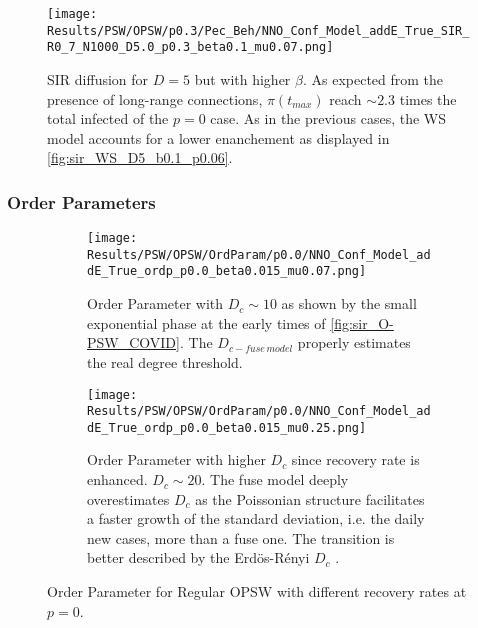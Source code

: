 \documentclass[a4paper,10pt,twoside]{book} %
\theoremstyle{definition}
\begin{document}
\begin{figure}[H]
	\centering
	\texttt{[image: Results/PSW/OPSW/p0.3/Pec\_Beh/NNO\_Conf\_Model\_addE\_True\_SIR\_R0\_7\_N1000\_D5.0\_p0.3\_beta0.1\_mu0.07.png]}
	\caption{SIR diffusion for $ D = 5$ but with higher $\beta$. As expected from the presence of long-range connections, $\pi(t_{max})$ reach $\sim 2.3$ times the total infected of the $ p=0$ case. As in the previous cases, the WS model accounts for a lower enanchement as displayed in \autoref{fig:sir_WS_D5_b0.1_p0.06}.}
	\label{fig:sir_O-PSW_D5_p0.3_b0.1}
\end{figure}

\clearpage
\subsubsection*{Order Parameters}
\begin{figure}[t]
	\begin{subfigure}[t]{0.48\linewidth}
		\centering
		\texttt{[image: Results/PSW/OPSW/OrdParam/p0.0/NNO\_Conf\_Model\_addE\_True\_ordp\_p0.0\_beta0.015\_mu0.07.png]} 
		\caption{Order Parameter with $D_c \sim 10$ as shown by the small exponential phase at the early times of \autoref{fig:sir_O-PSW_COVID}. The $ D_{c-fuse\, model}$ properly estimates the real degree threshold.}
		\label{fig:Ordp_OPSW_COVID19_D14}
	\end{subfigure}
	\begin{subfigure}[t]{0.48\linewidth}
		\centering
		\texttt{[image: Results/PSW/OPSW/OrdParam/p0.0/NNO\_Conf\_Model\_addE\_True\_ordp\_p0.0\_beta0.015\_mu0.25.png]}
		\caption{Order Parameter with higher $D_c$ since recovery rate is enhanced. $D_c \sim 20$.
		The fuse model deeply overestimates $ D_c$ as the Poissonian structure facilitates a faster growth of the standard deviation, i.e. the daily new cases, more than a fuse one. The transition is better described by the Erdös-Rényi $ D_c$ .}
		\label{fig:Ordp_OPSW_highmu_COVID19}
	\end{subfigure}
	\caption{Order Parameter for Regular OPSW with different recovery rates at $p = 0$. }
	\label{fig:Ordp_OPSW_COVID19_panel}
\end{figure}
\end{document}
